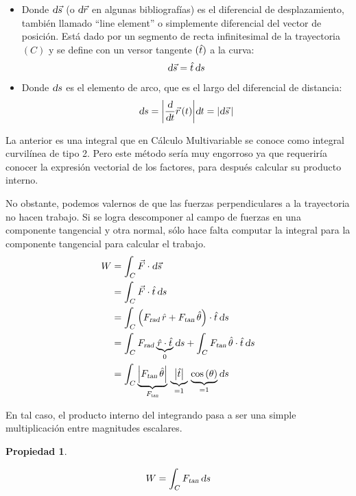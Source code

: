 \documentclass[a5paper,12pt,twoside]{book}
\newtheorem{prop}{{Propiedad}}[chapter]
\begin{document}
\begin{itemize}
    \item Donde $\textsl{d} \Vec{s}$ (o $\textsl{d} \Vec{r}$ en algunas bibliografías) es el diferencial de desplazamiento, también llamado ``line element'' o simplemente diferencial del vector de posición. Está dado por un segmento de recta infinitesimal de la trayectoria $(C)$ y se define con un versor tangente $(\hat{t})$ a la curva:
    \[ \textsl{d} \Vec{s} = \hat{t} \, \textsl{d} s \]
    
    \item Donde $\textsl{d} s$ es el elemento de arco, que es el largo del diferencial de distancia:
    \[
      \textsl{d} s = {\left| {\dfrac{\textsl{d}}{\textsl{d} t} \vec{r}\hspace{0.05cm}(t)} \right|} \textsl{d} t  = {\left| {\textsl{d} \Vec{s} \,} \right|}
    \]
\end{itemize}

La anterior es una integral que en Cálculo Multivariable se conoce como integral curvilínea de tipo 2. Pero este método sería muy engorroso ya que requeriría conocer la expresión vectorial de los factores, para después calcular su producto interno.

No obstante, podemos valernos de que las fuerzas perpendiculares a la trayectoria no hacen trabajo. Si se logra descomponer al campo de fuerzas en una componente tangencial y otra normal, sólo hace falta computar la integral para la componente tangencial para calcular el trabajo.
\begin{align*}
    W &= \int_C \Vec{F} \cdot \textsl{d} \Vec{s}
    \\
    &= \int_C \Vec{F} \cdot \hat{t} \, \textsl{d} s
    \\
    &= \int_C \left({{F}_\textsl{{rad}}} \, \hat{r} + {{F}_\textsl{{tan}}} \, \hat{\theta}\right) \cdot \hat{t} \, \textsl{d} s
    \\
    &= \int_C {{F}_\textsl{{rad}}} \underbrace{\hat{r} \cdot \hat{t}}_0 \textsl{d} s
    + \int_C {{F}_\textsl{{tan}}} \, \hat{\theta} \cdot \hat{t} \, \textsl{d} s
    \\
    &= \int_C \underbrace{{\left| {{{F}_\textsl{{tan}}} \, \hat{\theta}} \right|}}_{{{F}_\textsl{{tan}}}} \, \underbrace{{\left| {\hat{t}} \right|}}_{=1} \, \underbrace{\cos{(\theta)}}_{=1} \textsl{d} s
\end{align*}

En tal caso, el producto interno del integrando pasa a ser una simple multiplicación entre magnitudes escalares.

\begin{mdframed}[style=MyFrame1]
    \begin{prop}
    \end{prop}
    \begin{equation*}
        W = \int_C {{F}_\textsl{{tan}}} \, \textsl{d} s
    \end{equation*}
\end{mdframed}
\end{document}
